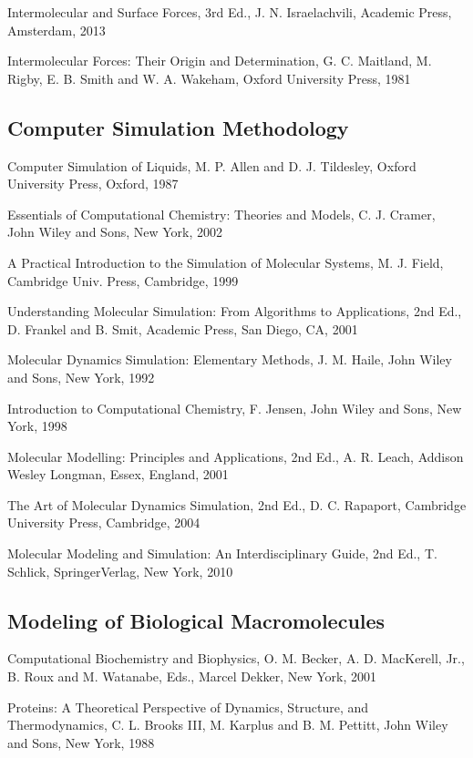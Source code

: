 \documentclass[letterpaper,11pt,english]{sphinxmanual}
\begin{document}
Intermolecular and Surface Forces, 3rd Ed., J. N. Israelachvili, Academic Press, Amsterdam, 2013

Intermolecular Forces: Their Origin and Determination, G. C. Maitland, M. Rigby, E. B. Smith and W. A. Wakeham, Oxford University Press, 1981


\subsection{Computer Simulation Methodology}
\label{\detokenize{text/references:computer-simulation-methodology}}
Computer Simulation of Liquids, M. P. Allen and D. J. Tildesley, Oxford University Press, Oxford, 1987

Essentials of Computational Chemistry: Theories and Models, C. J. Cramer, John Wiley and Sons, New York, 2002

A Practical Introduction to the Simulation of Molecular Systems, M. J. Field, Cambridge Univ. Press, Cambridge, 1999

Understanding Molecular Simulation: From Algorithms to Applications, 2nd Ed., D. Frankel and B. Smit, Academic Press, San Diego, CA, 2001

Molecular Dynamics Simulation: Elementary Methods, J. M. Haile, John Wiley and Sons, New York, 1992

Introduction to Computational Chemistry, F. Jensen, John Wiley and Sons, New York, 1998

Molecular Modelling: Principles and Applications, 2nd Ed., A. R. Leach, Addison Wesley Longman, Essex, England, 2001

The Art of Molecular Dynamics Simulation, 2nd Ed., D. C. Rapaport, Cambridge University Press, Cambridge, 2004

Molecular Modeling and Simulation: An Interdisciplinary Guide, 2nd Ed., T. Schlick, Springer\sphinxhyphen{}Verlag, New York, 2010


\subsection{Modeling of Biological Macromolecules}
\label{\detokenize{text/references:modeling-of-biological-macromolecules}}
Computational Biochemistry and Biophysics, O. M. Becker, A. D. MacKerell, Jr., B. Roux and M. Watanabe, Eds., Marcel Dekker, New York, 2001

Proteins: A Theoretical Perspective of Dynamics, Structure, and Thermodynamics, C. L. Brooks III, M. Karplus and B. M. Pettitt, John Wiley and Sons, New York, 1988
\end{document}
